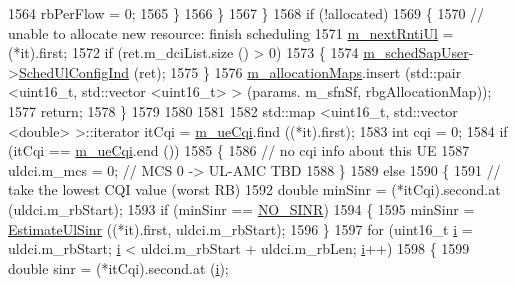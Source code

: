 \begin{DoxyCode}
1564                   rbPerFlow = 0;                 
1565                 \}
1566             \}
1567         \}
1568       \textcolor{keywordflow}{if} (!allocated)
1569         \{
1570           \textcolor{comment}{// unable to allocate new resource: finish scheduling}
1571           \hyperlink{classns3_1_1TdMtFfMacScheduler_afc4fae2138add1ae9e42970e93046f52}{m\_nextRntiUl} = (*it).first;
1572           \textcolor{keywordflow}{if} (ret.m\_dciList.size () > 0)
1573             \{
1574               \hyperlink{classns3_1_1TdMtFfMacScheduler_a2e3ce0452adef9b30cce73ac31c93ef4}{m\_schedSapUser}->\hyperlink{classns3_1_1FfMacSchedSapUser_a1b89636256701a84d990db7db8aea874}{SchedUlConfigInd} (ret);
1575             \}
1576           \hyperlink{classns3_1_1TdMtFfMacScheduler_a08ce126c31d6c975542dfa7038bd27c8}{m\_allocationMaps}.insert (std::pair <uint16\_t, std::vector <uint16\_t> > (params.
      m\_sfnSf, rbgAllocationMap));
1577           \textcolor{keywordflow}{return};
1578         \}
1579 
1580 
1581 
1582       std::map <uint16\_t, std::vector <double> >::iterator itCqi = \hyperlink{classns3_1_1TdMtFfMacScheduler_a586af40d969e8daa42c28b96a67b5854}{m\_ueCqi}.find ((*it).first);
1583       \textcolor{keywordtype}{int} cqi = 0;
1584       \textcolor{keywordflow}{if} (itCqi == \hyperlink{classns3_1_1TdMtFfMacScheduler_a586af40d969e8daa42c28b96a67b5854}{m\_ueCqi}.end ())
1585         \{
1586           \textcolor{comment}{// no cqi info about this UE}
1587           uldci.m\_mcs = 0; \textcolor{comment}{// MCS 0 -> UL-AMC TBD}
1588         \}
1589       \textcolor{keywordflow}{else}
1590         \{
1591           \textcolor{comment}{// take the lowest CQI value (worst RB)}
1592           \textcolor{keywordtype}{double} minSinr = (*itCqi).second.at (uldci.m\_rbStart);
1593           \textcolor{keywordflow}{if} (minSinr == \hyperlink{cqa-ff-mac-scheduler_8h_a520d71777be043568160c783a9c65fd5}{NO\_SINR})
1594             \{
1595               minSinr = \hyperlink{classns3_1_1TdMtFfMacScheduler_af478fd46ddd6b47842306eafff354069}{EstimateUlSinr} ((*it).first, uldci.m\_rbStart);
1596             \}
1597           \textcolor{keywordflow}{for} (uint16\_t \hyperlink{bernuolliDistribution_8m_a6f6ccfcf58b31cb6412107d9d5281426}{i} = uldci.m\_rbStart; \hyperlink{bernuolliDistribution_8m_a6f6ccfcf58b31cb6412107d9d5281426}{i} < uldci.m\_rbStart + uldci.m\_rbLen; 
      \hyperlink{bernuolliDistribution_8m_a6f6ccfcf58b31cb6412107d9d5281426}{i}++)
1598             \{
1599               \textcolor{keywordtype}{double} sinr = (*itCqi).second.at (\hyperlink{bernuolliDistribution_8m_a6f6ccfcf58b31cb6412107d9d5281426}{i});

\end{DoxyCode}
